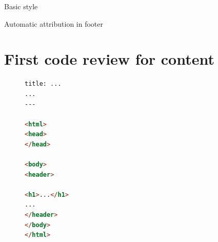 \documentclass[10pt]{beamer}
\begin{document}
\begin{frame}[fragile]{Basic style}
\vfill{}\vfill
\end{frame}

\begin{frame}[fragile]{Automatic attribution in footer}
\vfill{}\vfill
\end{frame}

\section{First code review for content}

{
\begin{frame}
\end{frame}}

\begin{frame}[fragile]
\begin{figure}[h]
\begin{lstlisting}[language=html]
title: ...
...
---

<html>
<head>
</head>

<body>
<header>

<h1>...</h1>
...
</header>
</body>
</html>
\end{lstlisting}
\end{figure}
\end{frame}
\end{document}
